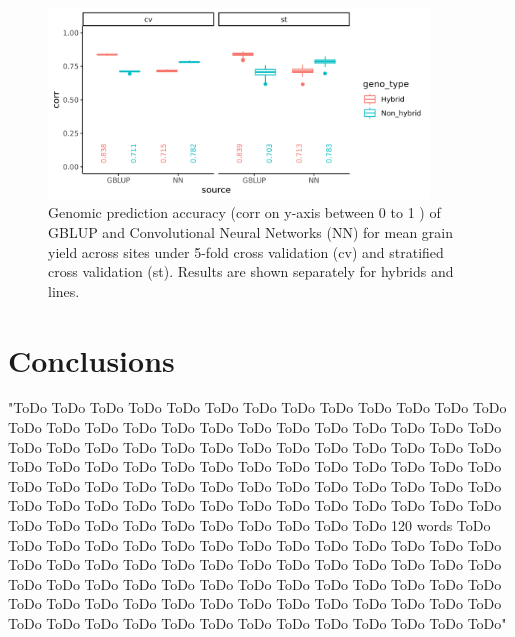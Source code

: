 \documentclass[english, biblatex]{lni}
\begin{document}
\begin{figure}[h]
    \centering
    \includegraphics[width=0.9\textwidth]{pred_corr_res_NN_2}
    \caption{Genomic prediction accuracy (corr on y-axis between 0 to 1 ) of GBLUP and Convolutional Neural Networks (NN) for mean grain yield across sites under 5-fold cross validation (cv) and stratified cross validation (st). Results are shown separately for hybrids and lines.}
    \label{fig_pred_corr_res_NN_2}
\end{figure}

\section{Conclusions}

"ToDo ToDo ToDo ToDo ToDo ToDo ToDo ToDo ToDo ToDo ToDo ToDo ToDo ToDo ToDo ToDo ToDo ToDo ToDo ToDo ToDo ToDo ToDo ToDo ToDo ToDo ToDo ToDo ToDo ToDo ToDo ToDo ToDo ToDo ToDo ToDo ToDo ToDo ToDo ToDo ToDo ToDo ToDo ToDo ToDo ToDo ToDo ToDo ToDo ToDo ToDo ToDo ToDo ToDo ToDo ToDo ToDo ToDo ToDo ToDo ToDo ToDo ToDo ToDo ToDo ToDo ToDo ToDo ToDo ToDo ToDo ToDo ToDo ToDo ToDo ToDo ToDo ToDo ToDo ToDo ToDo ToDo ToDo ToDo ToDo ToDo ToDo ToDo 120 words ToDo ToDo ToDo ToDo ToDo ToDo ToDo ToDo ToDo ToDo ToDo ToDo ToDo ToDo ToDo ToDo ToDo ToDo ToDo ToDo ToDo ToDo ToDo ToDo ToDo ToDo ToDo ToDo ToDo ToDo ToDo ToDo ToDo ToDo ToDo ToDo ToDo ToDo ToDo ToDo ToDo ToDo ToDo ToDo ToDo ToDo ToDo ToDo ToDo ToDo ToDo ToDo ToDo ToDo ToDo ToDo ToDo ToDo ToDo ToDo ToDo ToDo ToDo ToDo ToDo ToDo"

\printbibliography%
\end{document}
